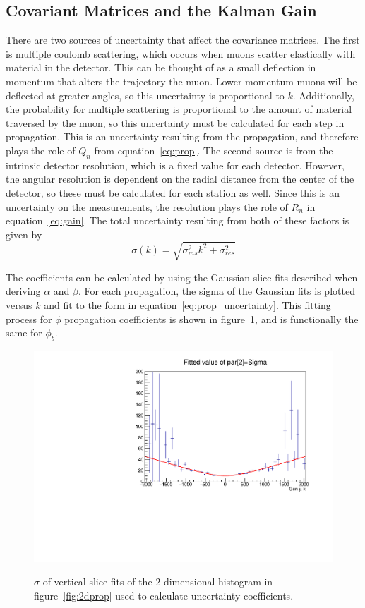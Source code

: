 \subsection{Covariant Matrices and the Kalman Gain} \label{sec:kbmtf_cov}
There are two sources of uncertainty that affect the covariance matrices. The first is multiple coulomb scattering, which occurs when muons scatter elastically with material in the detector. This can be thought of as a small deflection in momentum that alters the trajectory the muon. Lower momentum muons will be deflected at greater angles, so this uncertainty is proportional to $k$. Additionally, the probability for multiple scattering is proportional to the amount of material traversed by the muon, so this uncertainty must be calculated for each step in propagation. This is an uncertainty resulting from the propagation, and therefore plays the role of $Q_n$ from equation~\ref{eq:prop}. The second source is from the intrinsic detector resolution, which is a fixed value for each detector. However, the angular resolution is dependent on the radial distance from the center of the detector, so these must be calculated for each station as well. Since this is an uncertainty on the measurements, the resolution plays the role of $R_n$ in equation~\ref{eq:gain}. The total uncertainty resulting from both of these factors is given by
\begin{equation}
	\label{eq:prop_uncertainty}
	\sigma(k)=\sqrt{\sigma_{ms}^2k^2+\sigma_{res}^2}
\end{equation}

The coefficients can be calculated by using the Gaussian slice fits described when deriving $\alpha$ and $\beta$. For each propagation, the sigma of the Gaussian fits is plotted versus $k$ and fit to the form in equation~\ref{eq:prop_uncertainty}. This fitting process for $\phi$ propagation coefficients is shown in figure~\ref{fig:phi_uncertainty}, and is functionally the same for $\phi_b$.

\begin{figure}[htb!]
	\centering
	\includegraphics[width=0.45\linewidth]{figs/04_muons/phiprop_sigma.pdf}
	\label{fig:2dprop_sigma}
	\caption[$\sigma$ of vertical slice fits of the 2-dimensional histogram in figure~\ref{fig:2dprop} used to calculate uncertainty coefficients.]
	{$\sigma$ of vertical slice fits of the 2-dimensional histogram in figure~\ref{fig:2dprop} used to calculate uncertainty coefficients.}
	\label{fig:phi_uncertainty}
\end{figure}

